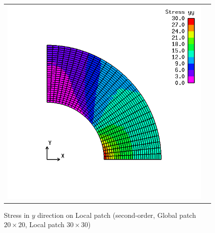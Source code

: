 \begin{figure}[hbtp]
  \begin{tabular}{cc}
    \begin{minipage}[t]{0.45\hsize}
      \centering
      \includegraphics[keepaspectratio, scale=0.3]
      {fig/result_data_etc/s-iga03/contour/2.png}
      \caption{Stress in $y$ direction on Local patch (second-order, Global patch $20\times 20$, Local patch $30\times 30$)}
      \label{fig:s-iga03 y 2}
    \end{minipage} &
    \begin{minipage}[t]{0.45\hsize}
      \centering
      \includegraphics[keepaspectratio, scale=0.3]

\end{minipage}
\end{tabular}
\end{figure}
